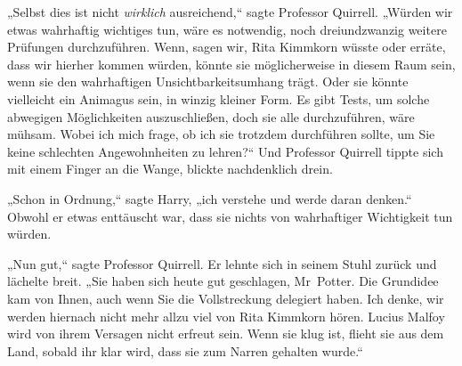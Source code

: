 „Selbst dies ist nicht \emph{wirklich} ausreichend,“ sagte Professor Quirrell. „Würden wir etwas wahrhaftig wichtiges tun, wäre es notwendig, noch dreiundzwanzig weitere Prüfungen durchzuführen. Wenn, sagen wir, Rita Kimmkorn wüsste oder erräte, dass wir hierher kommen würden, könnte sie möglicherweise in diesem Raum sein, wenn sie den wahrhaftigen Unsichtbarkeitsumhang trägt. Oder sie könnte vielleicht ein Animagus sein, in winzig kleiner Form. Es gibt Tests, um solche abwegigen Möglichkeiten auszuschließen, doch sie alle durchzuführen, wäre mühsam. Wobei ich mich frage, ob ich sie trotzdem durchführen sollte, um Sie keine schlechten Angewohnheiten zu lehren?“ Und Professor Quirrell tippte sich mit einem Finger an die Wange, blickte nachdenklich drein.

„Schon in Ordnung,“ sagte Harry, „ich verstehe und werde daran denken.“ Obwohl er etwas enttäuscht war, dass sie nichts von wahrhaftiger Wichtigkeit tun würden.

„Nun gut,“ sagte Professor Quirrell. Er lehnte sich in seinem Stuhl zurück und lächelte breit. „Sie haben sich heute gut geschlagen, Mr~Potter. Die Grundidee kam von Ihnen, auch wenn Sie die Vollstreckung delegiert haben. Ich denke, wir werden hiernach nicht mehr allzu viel von Rita Kimmkorn hören. Lucius Malfoy wird von ihrem Versagen nicht erfreut sein. Wenn sie klug ist, flieht sie aus dem Land, sobald ihr klar wird, dass sie zum Narren gehalten wurde.“

